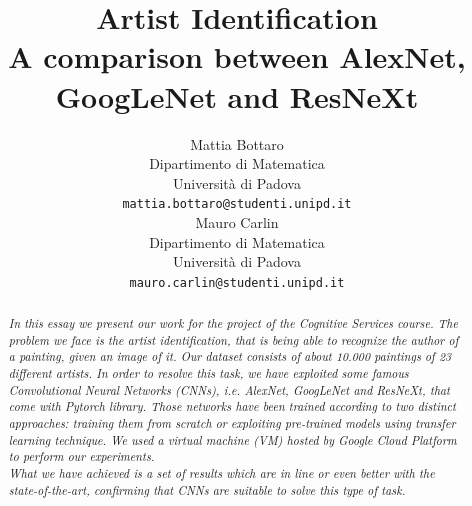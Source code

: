 \documentclass{article}
\title{Artist Identification	\\  A comparison between AlexNet, GoogLeNet and ResNeXt}
\author{
  Mattia Bottaro \\
  Dipartimento  di Matematica\\
  Università di Padova \\
  \texttt{mattia.bottaro@studenti.unipd.it} \\
   \And
  Mauro Carlin \\
Dipartimento  di Matematica\\
Università di Padova \\
\texttt{mauro.carlin@studenti.unipd.it} \\
}
\begin{document}
\maketitle

\begin{abstract}
	\textit{In this essay we present our work for the project of the Cognitive Services course.
	The problem we face is the artist identification, that is being able to recognize the author of a painting, given an image of it. Our dataset consists of about 10.000 paintings of 23 different artists.
	In order to resolve this task, we have exploited some famous Convolutional Neural Networks (CNNs), i.e. AlexNet, GoogLeNet and ResNeXt, that come with \textit{Pytorch} library. Those networks have been trained according to two distinct approaches: training them from scratch or exploiting pre-trained models using transfer learning technique. We used a virtual machine (VM) hosted by \textit{Google Cloud Platform} to perform our experiments.\\
	What we have achieved is a set of results which are in line or even better with the state-of-the-art, confirming that CNNs are suitable to solve this type of task.}
\end{abstract}


\end{document}

